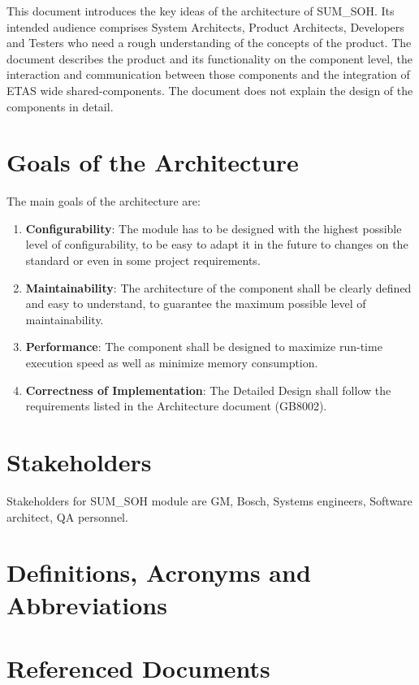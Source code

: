 This document introduces the key ideas of the architecture of SUM_SOH.
Its intended audience comprises System Architects, Product Architects, Developers and Testers who need a rough understanding of the concepts of the product.
The document describes the product and its functionality on the component level, the interaction and communication between those components and the integration of ETAS wide shared-components.
The document does not explain the design of the components in detail.

\section{Goals of the Architecture}

The main goals of the architecture are:

\begin{enumerate}
\item \textbf{Configurability}: The module has to be designed with the highest possible level of configurability, to be easy to adapt it in the future to changes on the standard or even in some project requirements.
\item \textbf{Maintainability}: The architecture of the component shall be clearly defined and easy to understand, to guarantee the maximum possible level of maintainability.
\item \textbf{Performance}: The component shall be designed to maximize run-time execution speed as well as minimize memory consumption.
\item \textbf{Correctness of Implementation}: The Detailed Design shall follow the requirements listed in the Architecture document (GB8002).
\end{enumerate}

\section{Stakeholders}

Stakeholders for SUM\_SOH module are GM, Bosch, Systems engineers, Software architect, QA personnel.

\section{Definitions, Acronyms and Abbreviations}
\label{sec:Definitions}


\section{Referenced Documents}
\label{section:referenced}


